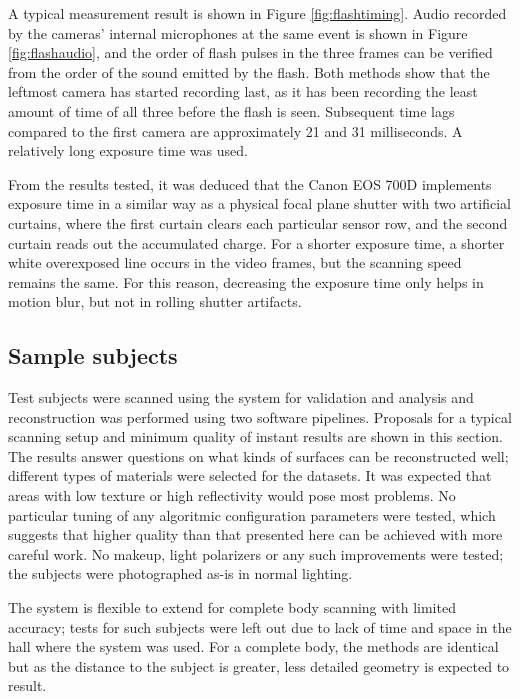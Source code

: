 A typical measurement result is shown in Figure \ref{fig:flashtiming}.
Audio recorded by the cameras' internal microphones at the same event is shown in Figure \ref{fig:flashaudio}, and the order of flash pulses in the three frames can be verified from the order of the sound emitted by the flash.
Both methods show that the leftmost camera has started recording last, as it has been recording the least amount of time of all three before the flash is seen.
Subsequent time lags compared to the first camera are approximately 21 and 31 milliseconds.
A relatively long exposure time was used.

From the results tested, it was deduced that the Canon EOS 700D implements exposure time in a similar way as a physical focal plane shutter with two artificial curtains, where the first curtain clears each particular sensor row, and the second curtain reads out the accumulated charge.
For a shorter exposure time, a shorter white overexposed line occurs in the video frames, but the scanning speed remains the same.
For this reason, decreasing the exposure time only helps in motion blur, but not in rolling shutter artifacts.

\subsection{Sample subjects} \label{sec:samplesubjects}


Test subjects were scanned using the system for validation and analysis and reconstruction was performed using two software pipelines.
Proposals for a typical scanning setup and minimum quality of instant results are shown in this section.
The results answer questions on what kinds of surfaces can be reconstructed well; different types of materials were selected for the datasets.
It was expected that areas with low texture or high reflectivity would pose most problems.
No particular tuning of any algoritmic configuration parameters were tested, which suggests that higher quality than that presented here can be achieved with more careful work.
No makeup, light polarizers or any such improvements were tested; the subjects were photographed as-is in normal lighting.

The system is flexible to extend for complete body scanning with limited accuracy; tests for such subjects were left out due to lack of time and space in the hall where the system was used.
For a complete body, the methods are identical but as the distance to the subject is greater, less detailed geometry is expected to result.

